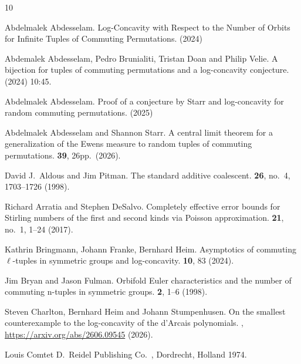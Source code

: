 \documentclass[12pt]{article}
\begin{document}
\baselineskip=12pt

\begin{thebibliography}{10}

Abdelmalek Abdesselam.
\newblock Log-Concavity with Respect to the Number of Orbits for Infinite Tuples of Commuting Permutations.
 (2024)


Abdemalek Abdesselam, Pedro Brunialiti, Tristan Doan and Philip Velie.
\newblock A bijection for tuples of commuting permutations and a log-concavity conjecture.
 (2024) 10:45.

Abdelmalek Abdesselam.
\newblock Proof of a conjecture by Starr and log-concavity for random commuting permutations.
 (2025)

Abdelmalek Abdesselam and Shannon Starr.
\newblock A central limit theorem for a generalization of the Ewens measure to random tuples of commuting permutations.
 {\bf 39}, 26pp.~(2026).

David J.~Aldous and Jim Pitman.
\newblock The standard additive coalescent.
 {\bf 26}, no.~4, 1703--1726 (1998).

Richard Arratia and Stephen DeSalvo.
\newblock Completely effective error bounds for Stirling numbers of the first and second kinds via Poisson approximation.
 {\bf 21}, no.~1, 1--24 (2017).

Kathrin Bringmann, Johann Franke, Bernhard Heim.
\newblock
Asymptotics of commuting 
$\ell$-tuples in symmetric groups and log-concavity.
 {\bf 10}, 83 (2024).

Jim Bryan and Jason Fulman.
\newblock Orbifold Euler characteristics and the number of commuting n-tuples in symmetric groups.
 {\bf 2}, 1--6 (1998).

Steven Charlton, Bernhard Heim and Johann Stumpenhusen.
\newblock On the smallest counterexample to the log-concavity of the d'Arcais polynomials.
, \url{https://arxiv.org/abs/2606.09545} (2026).

Louis Comtet
\newblock D.~Reidel Publishing Co.~, Dordrecht, Holland 1974.


\end{thebibliography}
\end{document}

